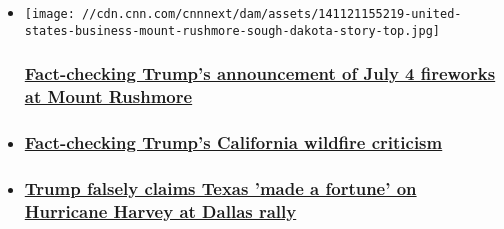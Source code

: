 \begin{itemize}
\item
  \href{/2020/01/16/politics/trump-rushmore-fireworks-fact-check/index.html}{}

  \texttt{[image: //cdn.cnn.com/cnnnext/dam/assets/141121155219-united-states-business-mount-rushmore-sough-dakota-story-top.jpg]}

  \hypertarget{fact-checking-trumps-announcement-of-july-4-fireworks-at-mount-rushmore}{%
  \subsubsection{\texorpdfstring{\href{/2020/01/16/politics/trump-rushmore-fireworks-fact-check/index.html}{Fact-checking
  Trump's announcement of July 4 fireworks at Mount
  Rushmore}}{Fact-checking Trump's announcement of July 4 fireworks at Mount Rushmore}}\label{fact-checking-trumps-announcement-of-july-4-fireworks-at-mount-rushmore}}
\item
  \hypertarget{fact-checking-trumps-california-wildfire-criticism}{%
  \subsubsection{\texorpdfstring{\href{/2019/11/04/politics/california-wildfire-trump-fact-check/index.html}{Fact-checking
  Trump's California wildfire
  criticism}}{Fact-checking Trump's California wildfire criticism}}\label{fact-checking-trumps-california-wildfire-criticism}}
\item
  \hypertarget{trump-falsely-claims-texas-made-a-fortune-on-hurricane-harvey-at-dallas-rally}{%
  \subsubsection{\texorpdfstring{\href{/2019/10/18/politics/fact-check-trump-rally-dallas-false-claims/index.html}{Trump
  falsely claims Texas 'made a fortune' on Hurricane Harvey at Dallas
  rally}}{Trump falsely claims Texas 'made a fortune' on Hurricane Harvey at Dallas rally}}\label{trump-falsely-claims-texas-made-a-fortune-on-hurricane-harvey-at-dallas-rally}}
\end{itemize}

